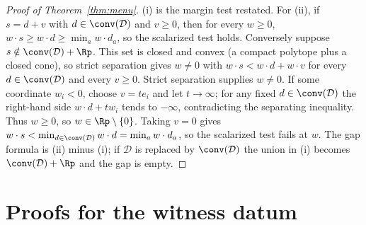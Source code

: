 \begin{proof}[Proof of Theorem~\ref{thm:menu}]
(i) is the margin test restated. For (ii), if $s=d+v$ with $d\in\conv(\mathcal D)$ and $v\ge0$, then for every $w\ge0$, $w\cdot s\ge w\cdot d\ge\min_aw\cdot d_a$, so the scalarized test holds. Conversely suppose $s\notin\conv(\mathcal D)+\Rp$. This set is closed and convex (a compact polytope plus a closed cone), so strict separation gives $w\ne0$ with $w\cdot s<w\cdot d+w\cdot v$ for every $d\in\conv(\mathcal D)$ and every $v\ge0$. Strict separation supplies $w\ne0$. If some coordinate $w_i<0$, choose $v=t e_i$ and let $t\to\infty$; for any fixed $d\in\conv(\mathcal D)$ the right-hand side $w\cdot d+t w_i$ tends to $-\infty$, contradicting the separating inequality. Thus $w\ge0$, so $w\in\Rp\setminus\{0\}$. Taking $v=0$ gives $w\cdot s<\min_{d\in\conv(\mathcal D)}w\cdot d=\min_aw\cdot d_a$, so the scalarized test fails at $w$. The gap formula is (ii) minus (i); if $\mathcal D$ is replaced by $\conv(\mathcal D)$ the union in (i) becomes $\conv(\mathcal D)+\Rp$ and the gap is empty.
\end{proof}

\section{Proofs for the witness datum}\label{app:witness}

